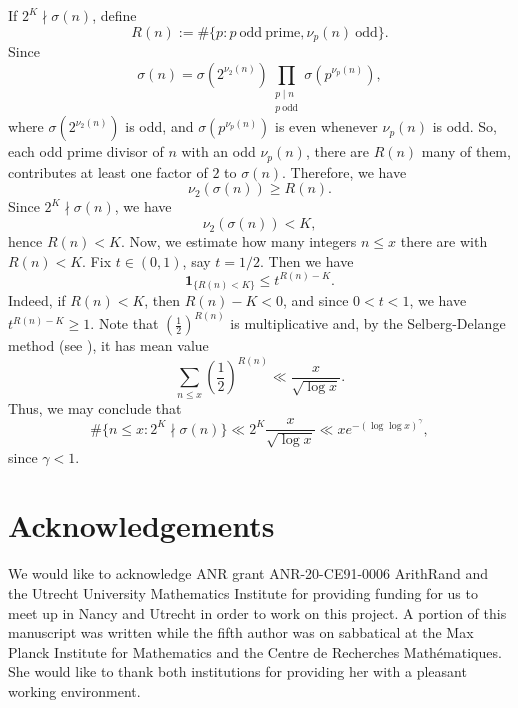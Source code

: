 \documentclass[11pt, reqno]{amsart}
\theoremstyle{remark}
\numberwithin{theorem}{section}
\numberwithin{proposition}{section}
\numberwithin{lemma}{section}
\numberwithin{corollary}{section}
\numberwithin{equation}{section}
\numberwithin{conjecture}{section}
\numberwithin{definition}{section}
\begin{document}
If $2^K \nmid \sigma(n)$, define $$R(n):= \#\{p: p \ \mathrm{odd \ prime}, \nu_p(n) \ \mathrm{odd}\}.$$ Since $$\sigma(n)= \sigma(2^{\nu_2(n)})\prod_{\substack{p\mid n\\ p\ \mathrm{odd}}}\sigma\!\left(p^{\nu_p(n)}\right),$$ where $\sigma(2^{\nu_2(n)})$ is odd, and $\sigma(p^{\nu_p(n)})$ is even whenever $\nu_p(n)$ is odd. So, each odd prime  divisor of $n$ with an odd $\nu_p(n)$, there are $R(n)$ many of them, contributes at least one factor of $2$ to $\sigma(n)$. Therefore, we have 
$$\nu_2(\sigma(n)) \ge R(n).$$ Since $2^K \nmid \sigma(n)$, we have $$\nu_2(\sigma(n)) < K,$$ hence $R(n) < K.$ Now, we estimate how many integers $n\leq x$ there are with $R(n) < K$. Fix $t \in (0, 1)$, say $t = 1/2.$ Then we have $$\mathbf{1}_{\{R(n) < K\}} \leq t^{R(n)-K}.$$ Indeed, if $R(n)<K$, then $R(n)-K<0$, and since $0<t<1$, we have $t^{R(n)-K} \geq 1$. Note that $(\frac{1}{2})^{R(n)}$ is multiplicative and, by the Selberg-Delange method (see \cite[Theorem II.5.3]{TenenbaumITAN22}), it has mean value $$\sum_{n \leq x} \left(\frac{1}{2}\right)^{R(n)} \ll \frac{x}{\sqrt{\log x}}.$$ Thus, we may conclude that $$\#\{n \leq x: 2^K \nmid \sigma(n)\} \ll 2^K \frac{x}{\sqrt{\log x}} \ll xe^{-(\log\log x)^\gamma},$$ since $\gamma < 1.$
 




\section*{Acknowledgements}
We would like to acknowledge ANR grant ANR-20-CE91-0006  ArithRand and the Utrecht University Mathematics Institute for providing funding for us to meet up in Nancy and Utrecht in order to work on this project. A portion of this manuscript was written while the fifth author was on sabbatical at the Max Planck Institute for Mathematics and the Centre de Recherches Mathématiques. She would like to thank both institutions for providing her with a pleasant working environment.
\end{document}
